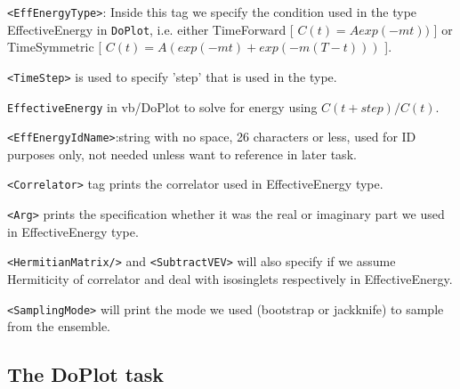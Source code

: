 \documentclass[12pt]{article}
\newcommand{\vb}{\texttt}
\begin{document}
\begin{description}
\vb{<EffEnergyType>}: Inside this tag we specify the condition used in the type EffectiveEnergy in \vb{DoPlot}, i.e. either TimeForward [ $C(t) = Aexp(-mt))$ ]  or TimeSymmetric [ $C(t) = A(exp(-mt)+exp(-m(T-t)))$ ].

\vb{<TimeStep>} is used to specify 'step' that is used in the type.

\vb{EffectiveEnergy} in vb/{DoPlot} to solve for energy using $C(t+step)/C(t)$.

\vb{<EffEnergyIdName>}:string with no space, 26 characters or less, used for ID purposes only, not needed unless want to reference in later task.

\vb{<Correlator>} tag prints the correlator used in EffectiveEnergy type.

\vb{<Arg>} prints the specification whether it was the real or imaginary part we used in EffectiveEnergy type.

\vb{<HermitianMatrix/>} and \vb{<SubtractVEV>} will also specify if we assume Hermiticity of correlator and deal with isosinglets respectively in EffectiveEnergy.

\vb{<SamplingMode>} will print the mode we used (bootstrap or jackknife) to sample from the ensemble.

\end{description}

\subsection{The DoPlot task}
\end{document}
